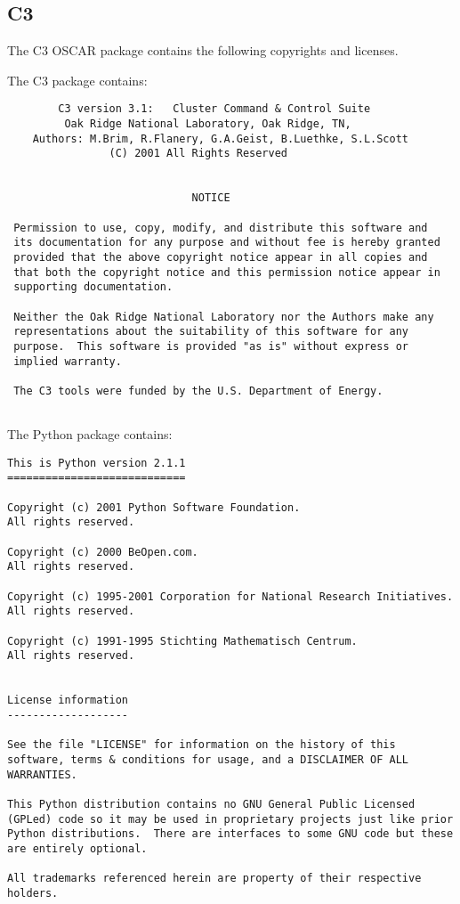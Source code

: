 %
%
%

\subsection{C3}
The C3 OSCAR package contains the following copyrights and licenses.

The C3 package contains:

\begin{verbatim}
        C3 version 3.1:   Cluster Command & Control Suite
         Oak Ridge National Laboratory, Oak Ridge, TN,
    Authors: M.Brim, R.Flanery, G.A.Geist, B.Luethke, S.L.Scott
                (C) 2001 All Rights Reserved


                             NOTICE

 Permission to use, copy, modify, and distribute this software and
 its documentation for any purpose and without fee is hereby granted
 provided that the above copyright notice appear in all copies and
 that both the copyright notice and this permission notice appear in
 supporting documentation.

 Neither the Oak Ridge National Laboratory nor the Authors make any
 representations about the suitability of this software for any
 purpose.  This software is provided "as is" without express or
 implied warranty.

 The C3 tools were funded by the U.S. Department of Energy.


\end{verbatim}

The Python package contains:

\begin{verbatim}
This is Python version 2.1.1
============================

Copyright (c) 2001 Python Software Foundation.
All rights reserved.

Copyright (c) 2000 BeOpen.com.
All rights reserved.

Copyright (c) 1995-2001 Corporation for National Research Initiatives.
All rights reserved.

Copyright (c) 1991-1995 Stichting Mathematisch Centrum.
All rights reserved.


License information
-------------------

See the file "LICENSE" for information on the history of this
software, terms & conditions for usage, and a DISCLAIMER OF ALL
WARRANTIES.

This Python distribution contains no GNU General Public Licensed
(GPLed) code so it may be used in proprietary projects just like prior
Python distributions.  There are interfaces to some GNU code but these
are entirely optional.

All trademarks referenced herein are property of their respective
holders.
\end{verbatim}

